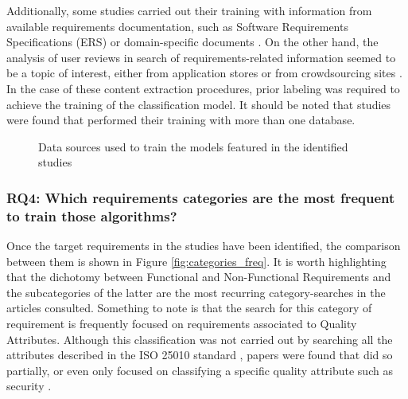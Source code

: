 \documentclass[conference]{IEEEtran}
\begin{document}
Additionally, some studies carried out their training with information from available requirements documentation, such as Software Requirements Specifications (ERS) or domain-specific documents \cite{6779538,6912260}. On the other hand, the analysis of user reviews in search of requirements-related information seemed to be a topic of interest, either from application stores \cite{Taj:2019:ADM:3328833.3328837,LI2018108} or from crowdsourcing sites \cite{Taj:2019:ADM:3328833.3328837,LI2018108}. In the case of these content extraction procedures, prior labeling was required to achieve the training of the classification model. It should be noted that studies were found that performed their training with more than one database.

\begin{figure}[!htbp]
    \caption{\label{fig:training}Data sources used to train the models featured in the identified studies}
\end{figure}

\subsubsection{RQ4: Which requirements categories are the most frequent to train those algorithms?}

Once the target requirements in the studies have been identified, the comparison between them is shown in Figure \ref{fig:categories_freq}. It is worth highlighting that the dichotomy between Functional and Non-Functional Requirements and the subcategories of the latter are the most recurring category-searches in the articles consulted. Something to note is that the search for this category of requirement is frequently focused on requirements associated to Quality Attributes. Although this classification was not carried out by searching all the attributes described in the ISO 25010 standard \cite{ISO25010}, papers were found that did so partially, or even only focused on classifying a specific quality attribute such as security \cite{7732349,6912260}.
\end{document}
